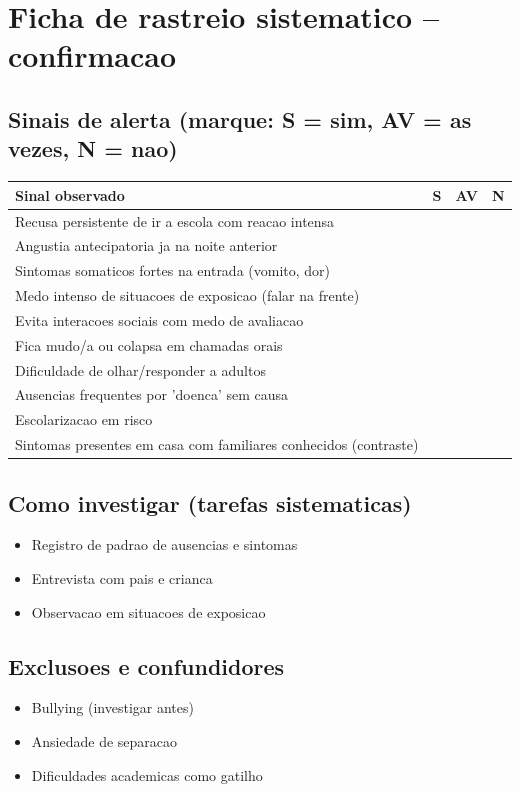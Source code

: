 \documentclass[a4paper,11pt]{book}
\begin{document}
\section*{Ficha de rastreio sistematico -- confirmacao}
\subsection*{Sinais de alerta (marque: S = sim, AV = as vezes, N = nao)}
\begin{tabular}{@{}p{11.5cm}ccc@{}}\toprule
Sinal observado & S & AV & N \\\midrule
Recusa persistente de ir a escola com reacao intensa & & & \\
Angustia antecipatoria ja na noite anterior & & & \\
Sintomas somaticos fortes na entrada (vomito, dor) & & & \\
Medo intenso de situacoes de exposicao (falar na frente) & & & \\
Evita interacoes sociais com medo de avaliacao & & & \\
Fica mudo/a ou colapsa em chamadas orais & & & \\
Dificuldade de olhar/responder a adultos & & & \\
Ausencias frequentes por 'doenca' sem causa & & & \\
Escolarizacao em risco & & & \\
Sintomas presentes em casa com familiares conhecidos (contraste) & & & \\
\bottomrule\end{tabular}
\subsection*{Como investigar (tarefas sistematicas)}
\begin{itemize}
\item Registro de padrao de ausencias e sintomas
\item Entrevista com pais e crianca
\item Observacao em situacoes de exposicao
\end{itemize}
\subsection*{Exclusoes e confundidores}
\begin{itemize}
\item Bullying (investigar antes)
\item Ansiedade de separacao
\item Dificuldades academicas como gatilho
\end{itemize}
\end{document}
